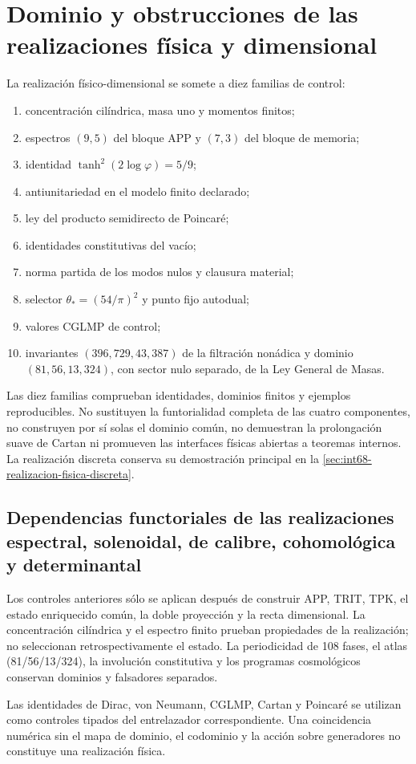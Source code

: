 \section[Controles de la realización físico-dimensional]{Dominio y obstrucciones de las realizaciones física y dimensional}
\label{sec:int68-certificado-historico}

La realización físico-dimensional se somete a diez familias de control:
\begin{enumerate}
 \item concentración cilíndrica, masa uno y momentos finitos;
 \item espectros \((9,5)\) del bloque APP y \((7,3)\) del bloque de memoria;
 \item identidad \(\tanh^2(2\log\varphi)=5/9\);
 \item antiunitariedad en el modelo finito declarado;
 \item ley del producto semidirecto de Poincaré;
 \item identidades constitutivas del vacío;
 \item norma partida de los modos nulos y clausura material;
 \item selector \(\theta_*=(54/\pi)^2\) y punto fijo autodual;
 \item valores CGLMP de control;
 \item invariantes \((396,729,43,387)\) de la filtración nonádica y
       dominio \((81,56,13,324)\), con sector nulo separado, de la Ley
       General de Masas.
\end{enumerate}

\begin{controlbox}[title={Alcance exacto de los controles}]
Las diez familias comprueban identidades, dominios finitos y ejemplos
reproducibles. No sustituyen la funtorialidad completa de las cuatro
componentes, no construyen por sí solas el dominio común, no demuestran la
prolongación suave de Cartan ni promueven las interfaces físicas abiertas a
teoremas internos. La realización discreta conserva su demostración principal
en la \cref{sec:int68-realizacion-fisica-discreta}.
\end{controlbox}

\subsection{Dependencias functoriales de las realizaciones espectral, solenoidal, de calibre, cohomológica y determinantal}

Los controles anteriores sólo se aplican después de construir APP, TRIT, TPK,
el estado enriquecido común, la doble proyección y la recta dimensional. La
concentración cilíndrica y el espectro finito prueban propiedades de la
realización; no seleccionan retrospectivamente el estado. La periodicidad de
108 fases, el atlas (81/56/13/324), la involución constitutiva y los
programas cosmológicos conservan dominios y falsadores separados.

Las identidades de Dirac, von Neumann, CGLMP, Cartan y Poincaré se utilizan
como controles tipados del entrelazador correspondiente. Una coincidencia
numérica sin el mapa de dominio, el codominio y la acción sobre generadores no
constituye una realización física.

